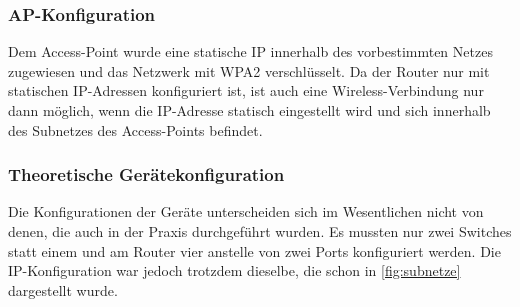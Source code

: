 \subsubsection{AP-Konfiguration}
Dem Access-Point wurde eine statische IP innerhalb des vorbestimmten Netzes zugewiesen und das Netzwerk mit WPA2 verschlüsselt. Da der Router nur mit statischen IP-Adressen
konfiguriert ist, ist auch eine Wireless-Verbindung nur dann möglich, wenn die IP-Adresse statisch eingestellt wird und sich innerhalb des Subnetzes des Access-Points befindet.

\subsubsection{Theoretische Gerätekonfiguration}
Die Konfigurationen der Geräte unterscheiden sich im Wesentlichen nicht von denen, die auch in der Praxis durchgeführt wurden. Es mussten nur zwei Switches statt einem und am Router vier
anstelle von zwei Ports konfiguriert werden. Die IP-Konfiguration war jedoch trotzdem dieselbe, die schon in \ref{fig:subnetze} dargestellt wurde.